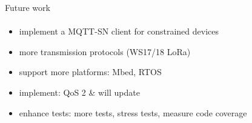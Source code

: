 \documentclass[10pt,aspectratio=\ratio,
compress
]{beamer}
\newcommand\meta{./meta}
\begin{document}
\begin{frame}{Future work}\framesubtitle{}
	\begin{itemize}
		\item implement a MQTT-SN client for constrained devices
		\item more transmission protocols (WS17/18 LoRa)
		\item support more platforms: Mbed, RTOS
		\item implement: QoS 2 \& will update
		\item enhance tests: more tests, stress tests, measure code coverage
	\end{itemize}
\end{frame}
% 
% 

\end{document}
